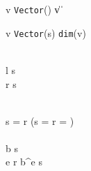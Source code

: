       {\Gamma \vdash v \Rightarrow \texttt{Vector}()}
      {\Gamma \vdash \| v \| \Rightarrow {}}


      {\Gamma \vdash v \Rightarrow \texttt{Vector}(s)}
      {\Gamma \vdash \texttt{dim}(v) \Rightarrow {}}


      { \\ \Gamma \vdash l \Rightarrow s \\ \Gamma \vdash r \Rightarrow s}
      {\Gamma \vdash {} \Rightarrow {}}


      { \\ s = r \lor (s =  \land r = ) \\\\%
       \Gamma \vdash b \Rightarrow s \\ \Gamma \vdash e \Rightarrow r}
      {\Gamma \vdash b^e \Rightarrow s}


